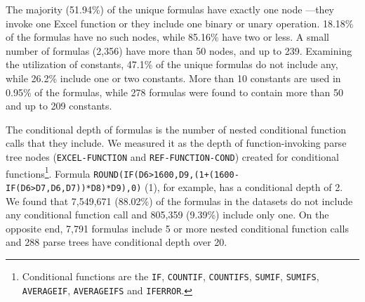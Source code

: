 \documentclass[times]{smrauth}
\begin{document}
The majority (51.94\%) of the unique formulas have exactly one  node ---they invoke one Excel function or they include one binary or unary operation. 18.18\% of the formulas have no such nodes, while 85.16\% have two or less. A small number of formulas (2,356) have more than 50  nodes, and up to 239. Examining the utilization of constants, 47.1\% of the unique formulas do not include any, while 26.2\% include one or two constants. More than 10 constants are used in 0.95\% of the formulas, while 278 formulas were found to contain more than 50 and up to 209 constants.

The conditional depth of formulas is the number of nested conditional function calls that they include. We measured it as the depth of function-invoking parse tree nodes (\texttt{EXCEL-FUNCTION} and \texttt{REF-FUNCTION-COND}) created for conditional functions\footnote{Conditional functions are the \texttt{IF}, \texttt{COUNTIF}, \texttt{COUNTIFS}, \texttt{SUMIF}, \texttt{SUMIFS}, \texttt{AVERAGEIF}, \texttt{AVERAGEIFS} and \texttt{IFERROR}.}. Formula \texttt{ROUND(IF(D6>1600,D9,(1+(1600-IF(D6>D7,D6,D7))*D8)*D9),0)} (1), for example, has a conditional depth of 2. We found that 7,549,671 (88.02\%) of the formulas in the datasets do not include any conditional function call and 805,359 (9.39\%) include only one. On the opposite end, 7,791 formulas include 5 or more nested conditional function calls and 288 parse trees have conditional depth over 20.
 
\end{document}
